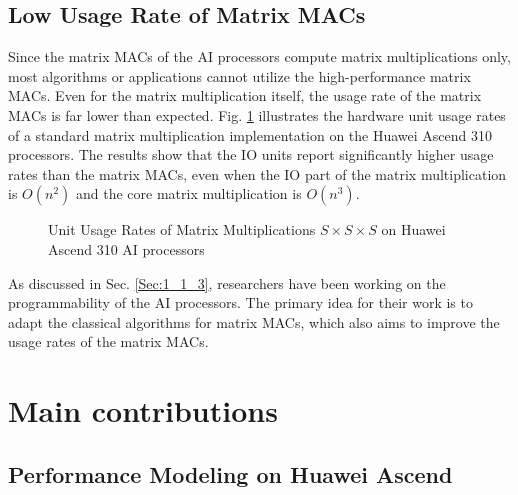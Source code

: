 \documentclass[12pt]{extbook}
\begin{document}
\subsection{Low Usage Rate of Matrix MACs}

Since the matrix MACs of the AI processors compute matrix multiplications only, most algorithms or applications cannot utilize the high-performance matrix MACs. Even for the matrix multiplication itself, the usage rate of the matrix MACs is far lower than expected. Fig. \ref{fig:low_usage} illustrates the hardware unit usage rates of a standard matrix multiplication implementation on the Huawei Ascend 310 processors. The results show that the IO units report significantly higher usage rates than the matrix MACs, even when the IO part of the matrix multiplication is $O(n^2)$ and the core matrix multiplication is $O(n^3)$.

\begin{figure}[tbp]
    \caption{Unit Usage Rates of Matrix Multiplications $S \times S \times S$ on Huawei Ascend 310 AI processors}
    \label{fig:low_usage}
    \end{figure}

As discussed in Sec. \ref{Sec:1_1_3}, researchers have been working on the programmability of the AI processors. The primary idea for their work is to adapt the classical algorithms for matrix MACs, which also aims to improve the usage rates of the matrix MACs.

\section{Main contributions}
\label{sec_1_3_contributions}

\subsection{Performance Modeling on Huawei Ascend}
\end{document}
